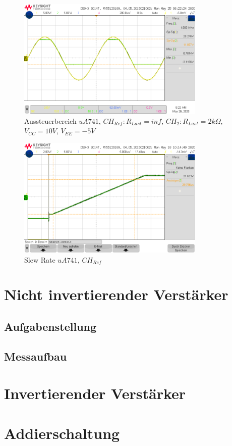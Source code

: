 \begin{figure}[H]
    \centering
    \includegraphics[width=0.8\textwidth]{Lab_1/Messungen/Folger/scope_5.png}
    \caption{Aussteuerbereich $uA741$, $CH_{Ref}: R_{Last} = inf$, $CH_{2}: R_{Last} = 2k\Omega$, $V_{CC} = 10V$, $V_{EE} = -5V$}
    \label{fig:my_label}
\end{figure}

\begin{figure}[H]
    \centering
    \includegraphics[width=0.8\textwidth]{Lab_1/Messungen/Folger/uberst-schw13.png}
    \caption{Slew Rate $uA741$, $CH_{Ref}$}
    \label{fig:my_label}
\end{figure}

\section{Nicht invertierender Verstärker}
\subsection{Aufgabenstellung}


\subsection{Messaufbau}


\section{Invertierender Verstärker}




\section{Addierschaltung}

